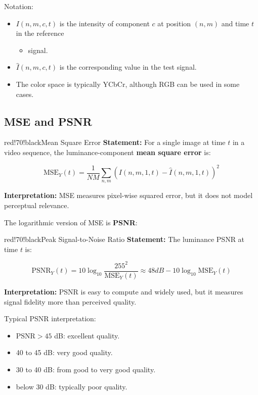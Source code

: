 Notation:

\begin{itemize}
\item $I(n,m,c,t)$ is the intensity of component $c$ at position $(n,m)$ and time $t$ in the reference
\begin{itemize}
\item signal.
\end{itemize}
\item $\hat{I}(n,m,c,t)$ is the corresponding value in the test signal.
\item The color space is typically YCbCr, although RGB can be used in some cases.
\end{itemize}

\subsection{MSE and PSNR}

\begin{calloutbox}{red!70!black}{Mean Square Error}
\textbf{Statement:} For a single image at time $t$ in a video sequence, the luminance-component \textbf{mean square error} is:

\[
\text{MSE}_Y(t) = \frac{1}{NM} \sum_{n,m}
\left(I(n,m,1,t) - \hat{I}(n,m,1,t)\right)^2
\]

\textbf{Interpretation:} MSE measures pixel-wise squared error, but it does not model perceptual relevance.
\end{calloutbox}

The logarithmic version of MSE is \textbf{PSNR}:

\begin{calloutbox}{red!70!black}{Peak Signal-to-Noise Ratio}
\textbf{Statement:} The luminance PSNR at time $t$ is:

\[
\text{PSNR}_Y(t) =
10\log_{10} \frac{255^2}{\text{MSE}_Y(t)}
\approx 48dB - 10\log_{10} \text{MSE}_Y(t)
\]

\textbf{Interpretation:} PSNR is easy to compute and widely used, but it measures signal fidelity more than perceived quality.
\end{calloutbox}

Typical PSNR interpretation:

\begin{itemize}
\item $\text{PSNR} > 45$ dB: excellent quality.
\item 40 to 45 dB: very good quality.
\item 30 to 40 dB: from good to very good quality.
\item below 30 dB: typically poor quality.
\end{itemize}

